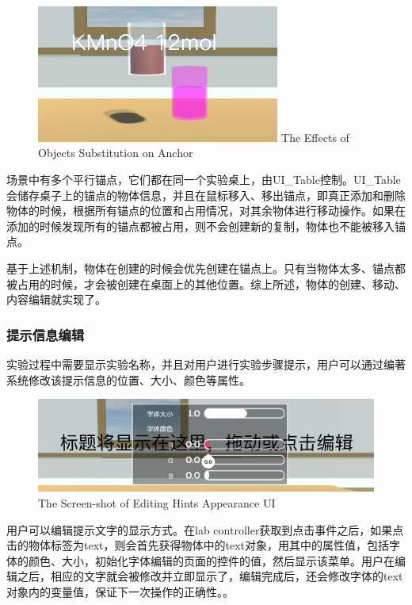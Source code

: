 \begin{figure}[!htp]
  \centering
  \includegraphics[width=8cm]{figure/substi.png}
    {The Effects of Objects Substitution on Anchor}
 \label{fig:substi}
\end{figure}

场景中有多个平行锚点，它们都在同一个实验桌上，由UI\_Table控制。UI\_Table会储存桌子上的锚点的物体信息，并且在鼠标移入、移出锚点，即真正添加和删除物体的时候，根据所有锚点的位置和占用情况，对其余物体进行移动操作。如果在添加的时候发现所有的锚点都被占用，则不会创建新的复制，物体也不能被移入锚点。

基于上述机制，物体在创建的时候会优先创建在锚点上。只有当物体太多、锚点都被占用的时候，才会被创建在桌面上的其他位置。综上所述，物体的创建、移动、内容编辑就实现了。


\subsubsection{提示信息编辑}
实验过程中需要显示实验名称，并且对用户进行实验步骤提示，用户可以通过编著系统修改该提示信息的位置、大小、颜色等属性。

\begin{figure}[!htp]
  \centering
  \includegraphics[width=12cm]{figure/text.png}
    {The Screen-shot of Editing Hints Appearance  UI}
 \label{fig:gm}
\end{figure}

用户可以编辑提示文字的显示方式。在lab controller获取到点击事件之后，如果点击的物体标签为text，则会首先获得物体中的text对象，用其中的属性值，包括字体的颜色、大小，初始化字体编辑的页面的控件的值，然后显示该菜单。用户在编辑之后，相应的文字就会被修改并立即显示了，编辑完成后，还会修改字体的text对象内的变量值，保证下一次操作的正确性。。

